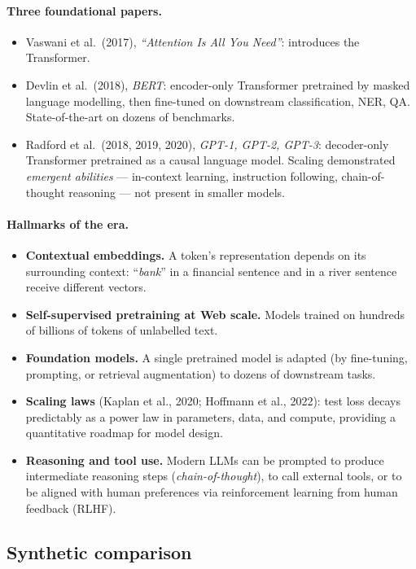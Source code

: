 \documentclass[12pt,a4paper]{report}
\theoremstyle{definition}
\theoremstyle{remark}
\begin{document}
\paragraph{Three foundational papers.}
\begin{itemize}
    \item Vaswani et al.\ (2017), \emph{``Attention Is All You Need''}: introduces the Transformer.
    \item Devlin et al.\ (2018), \emph{BERT}: encoder-only Transformer pretrained by masked language modelling, then fine-tuned on downstream classification, NER, QA. State-of-the-art on dozens of benchmarks.
    \item Radford et al.\ (2018, 2019, 2020), \emph{GPT-1, GPT-2, GPT-3}: decoder-only Transformer pretrained as a causal language model. Scaling demonstrated \emph{emergent abilities} --- in-context learning, instruction following, chain-of-thought reasoning --- not present in smaller models.
\end{itemize}

\paragraph{Hallmarks of the era.}
\begin{itemize}
    \item \textbf{Contextual embeddings.} A token's representation depends on its surrounding context: ``\emph{bank}'' in a financial sentence and in a river sentence receive different vectors.
    \item \textbf{Self-supervised pretraining at Web scale.} Models trained on hundreds of billions of tokens of unlabelled text.
    \item \textbf{Foundation models.} A single pretrained model is adapted (by fine-tuning, prompting, or retrieval augmentation) to dozens of downstream tasks.
    \item \textbf{Scaling laws} (Kaplan et al., 2020; Hoffmann et al., 2022): test loss decays predictably as a power law in parameters, data, and compute, providing a quantitative roadmap for model design.
    \item \textbf{Reasoning and tool use.} Modern LLMs can be prompted to produce intermediate reasoning steps (\emph{chain-of-thought}), to call external tools, or to be aligned with human preferences via reinforcement learning from human feedback (RLHF).
\end{itemize}

\subsection{Synthetic comparison}
\end{document}
